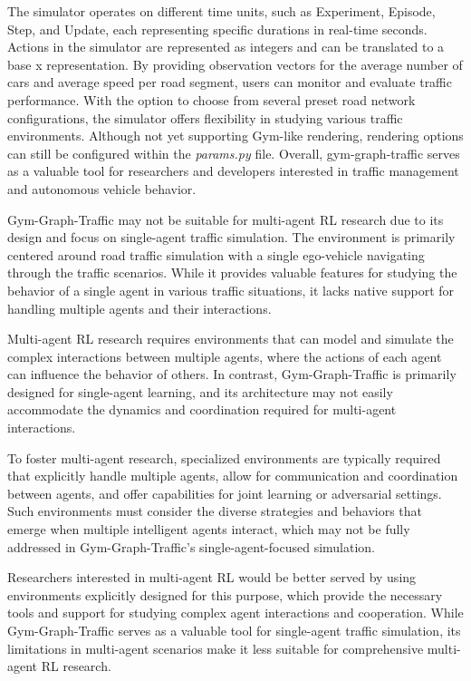 The simulator operates on different time units, such as Experiment, Episode, Step, and Update, each representing specific durations in real-time seconds. Actions in the simulator are represented as integers and can be translated to a base x representation. By providing observation vectors for the average number of cars and average speed per road segment, users can monitor and evaluate traffic performance. With the option to choose from several preset road network configurations, the simulator offers flexibility in studying various traffic environments. Although not yet supporting Gym-like rendering, rendering options can still be configured within the \emph{params.py} file. Overall, gym-graph-traffic serves as a valuable tool for researchers and developers interested in traffic management and autonomous vehicle behavior.

Gym-Graph-Traffic may not be suitable for multi-agent RL research due to its design and focus on single-agent traffic simulation. The environment is primarily centered around road traffic simulation with a single ego-vehicle navigating through the traffic scenarios. While it provides valuable features for studying the behavior of a single agent in various traffic situations, it lacks native support for handling multiple agents and their interactions.

Multi-agent RL research requires environments that can model and simulate the complex interactions between multiple agents, where the actions of each agent can influence the behavior of others. In contrast, Gym-Graph-Traffic is primarily designed for single-agent learning, and its architecture may not easily accommodate the dynamics and coordination required for multi-agent interactions.

To foster multi-agent research, specialized environments are typically required that explicitly handle multiple agents, allow for communication and coordination between agents, and offer capabilities for joint learning or adversarial settings. Such environments must consider the diverse strategies and behaviors that emerge when multiple intelligent agents interact, which may not be fully addressed in Gym-Graph-Traffic's single-agent-focused simulation.

Researchers interested in multi-agent RL would be better served by using environments explicitly designed for this purpose, which provide the necessary tools and support for studying complex agent interactions and cooperation. While Gym-Graph-Traffic serves as a valuable tool for single-agent traffic simulation, its limitations in multi-agent scenarios make it less suitable for comprehensive multi-agent RL research.

